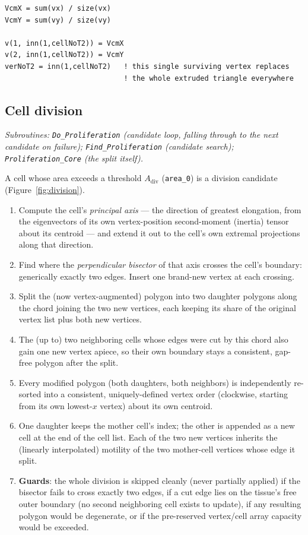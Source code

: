 \documentclass[11pt]{article}
\begin{document}
\begin{lstlisting}[caption={T2 core: collapsing the extruded triangle to its centroid
(from \texttt{T2\_swap.f90}).}]
VcmX = sum(vx) / size(vx)
VcmY = sum(vy) / size(vy)

v(1, inn(1,cellNoT2)) = VcmX
v(2, inn(1,cellNoT2)) = VcmY
verNoT2 = inn(1,cellNoT2)   ! this single surviving vertex replaces
                            ! the whole extruded triangle everywhere
\end{lstlisting}

\subsection{Cell division}
\label{sec:division}
\textit{Subroutines: \texttt{Do\_Proliferation} (candidate loop, falling through to
the next candidate on failure); \texttt{Find\_Proliferation} (candidate search);
\texttt{Proliferation\_Core} (the split itself).}

A cell whose area exceeds a threshold $A_{\mathrm{div}}$ (\texttt{area\_0}) is a
division candidate (Figure~\ref{fig:division}).
\begin{enumerate}[label=(\arabic*)]
  \item Compute the cell's \emph{principal axis} --- the direction of greatest
  elongation, from the eigenvectors of its own vertex-position second-moment (inertia)
  tensor about its centroid --- and extend it out to the cell's own extremal
  projections along that direction.
  \item Find where the \emph{perpendicular bisector} of that axis crosses the cell's
  boundary: generically exactly two edges. Insert one brand-new vertex at each
  crossing.
  \item Split the (now vertex-augmented) polygon into two daughter polygons along the
  chord joining the two new vertices, each keeping its share of the original vertex
  list plus both new vertices.
  \item The (up to) two neighboring cells whose edges were cut by this chord also gain
  one new vertex apiece, so their own boundary stays a consistent, gap-free polygon
  after the split.
  \item Every modified polygon (both daughters, both neighbors) is independently
  re-sorted into a consistent, uniquely-defined vertex order (clockwise, starting from
  its own lowest-$x$ vertex) about its own centroid.
  \item One daughter keeps the mother cell's index; the other is appended as a new cell
  at the end of the cell list. Each of the two new vertices inherits the (linearly
  interpolated) motility of the two mother-cell vertices whose edge it split.
  \item \textbf{Guards}: the whole division is skipped cleanly (never partially
  applied) if the bisector fails to cross exactly two edges, if a cut edge lies on the
  tissue's free outer boundary (no second neighboring cell exists to update), if any
  resulting polygon would be degenerate, or if the pre-reserved vertex/cell array
  capacity would be exceeded.
\end{enumerate}
\end{document}
